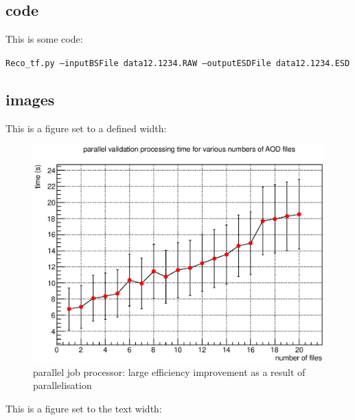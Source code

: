 \subsection{code}

This is some code:

\begin{center}
\footnotesize\texttt{Reco\_tf.py --inputBSFile data12.1234.RAW --outputESDFile data12.1234.ESD}
\end{center}

\subsection{images}

This is a figure set to a defined width:

\begin{figure}[H]
\begin{center}
\includegraphics[width=\measureUSpecification]{images/2014-04-10_1.eps}
\end{center}
\caption{parallel job processor: large efficiency improvement as a result of parallelisation}
\end{figure}

This is a figure set to the text width:

